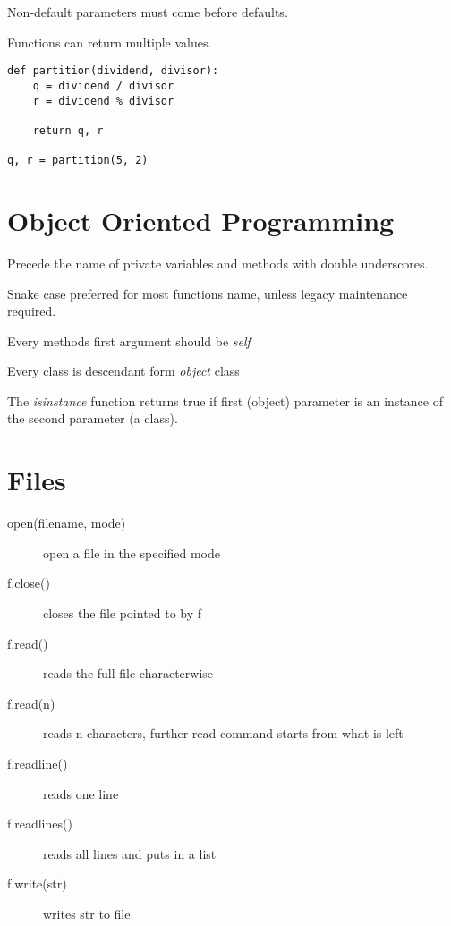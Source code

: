 \documentclass[a4paper, 12pt]{article}
\begin{document}
Non-default parameters must come before defaults.

Functions can return multiple values.
\begin{verbatim}
def partition(dividend, divisor):
    q = dividend / divisor
	r = dividend % divisor

	return q, r

q, r = partition(5, 2)
\end{verbatim}

\section{Object Oriented Programming}
Precede the name of private variables and methods with double underscores.

Snake case preferred for most functions name, unless legacy maintenance required.

Every methods first argument should be \emph{self}

Every class is descendant form \emph{object} class

The \emph{isinstance} function returns true if first (object) parameter is an instance of the second parameter (a class).

\section{Files}
\begin{description}
	\item[open(filename, mode)] open a file in the specified mode
	\item[f.close()] closes the file pointed to by f
	\item[f.read()] reads the full file characterwise
	\item[f.read(n)] reads n characters, further read command starts from what is left
	\item[f.readline()] reads one line
	\item[f.readlines()] reads all lines and puts in a list
	\item[f.write(str)] writes str to file
\end{description}
\end{document}
